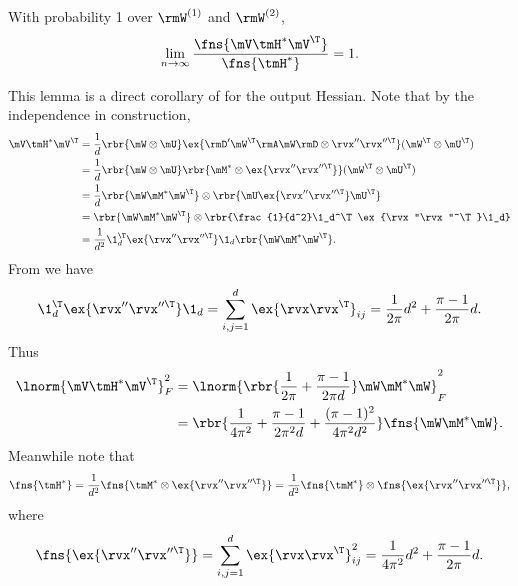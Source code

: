 \begin{proofof}{}
\begin{lemma}
\label{lemma:F-norm-equal-H}
With probability 1 over $\rmW^{(1)}$ and $\rmW^{(2)}$,
\begin{equation}
\lim_{n\to\infty}\frac{\fns{\mV\tmH^*\mV^\T}}{\fns{\tmH^*}}=1.
\end{equation}
\end{lemma}

\begin{proofof}{}
This lemma is a direct corollary of  for the output Hessian. Note that by the independence in construction,\begin{equation}
\begin{split}
\mV\tmH^*\mV^\T &= \frac{1}{d}\rbr{\mW\otimes\mU}\ex{\rmD'\mW^\T\rmA\mW\rmD\otimes\rvx''\rvx''^\T}(\mW^\T\otimes\mU^\T)\\
&= \frac{1}{d}\rbr{\mW\otimes\mU}\rbr{\mM^*\otimes\ex{\rvx''\rvx''^\T}}(\mW^\T\otimes\mU^\T)\\
&= \frac1d \rbr{\mW\mM^*\mW^\T}\otimes\rbr{\mU\ex{\rvx''\rvx''^\T}\mU^\T}\\
&= \rbr{\mW\mM^*\mW^\T}\otimes\rbr{\frac{1}{d^2}\1_d^\T\ex{\rvx''\rvx''^\T}\1_d}\\
&= \frac{1}{d^2}\1_d^\T\ex{\rvx''\rvx''^\T}\1_d\rbr{\mW\mM^*\mW^\T}.
\end{split}
\end{equation}
From  we have
\begin{equation}
    \1_d^\T\ex{\rvx''\rvx''^\T}\1_d = \sum_{i,j=1}^d\ex{\rvx\rvx^\T}_{ij} = \frac{1}{2\pi}d^2 + \frac{\pi-1}{2\pi}d.
\end{equation}
Thus \begin{equation}
\begin{split}
    \lnorm{\mV\tmH^*\mV^\T}_F^2 &= \lnorm{\rbr{\frac{1}{2\pi} + \frac{\pi-1}{2\pi d}}\mW\mM^*\mW}_F^2\\
    &= \rbr{\frac{1}{4\pi^2} + \frac{\pi-1}{2\pi^2 d} + \frac{(\pi-1)^2}{4\pi^2d^2}}\fns{\mW\mM^*\mW}.
\end{split}
\end{equation}
Meanwhile note that \begin{equation}
    \fns{\tmH^*} = \frac{1}{d^2}\fns{\tmM^*\otimes\ex{\rvx''\rvx''^\T}} = \frac{1}{d^2}\fns{\tmM^*}\otimes\fns{\ex{\rvx''\rvx''^\T}},
\end{equation}
where \begin{equation}
    \fns{\ex{\rvx''\rvx''^\T}} = \sum_{i,j=1}^d\ex{\rvx\rvx^\T}_{ij}^2 = \frac{1}{4\pi^2}d^2 + \frac{\pi-1}{2\pi}d.

\end{equation}
\end{proofof}
\end{proofof}
